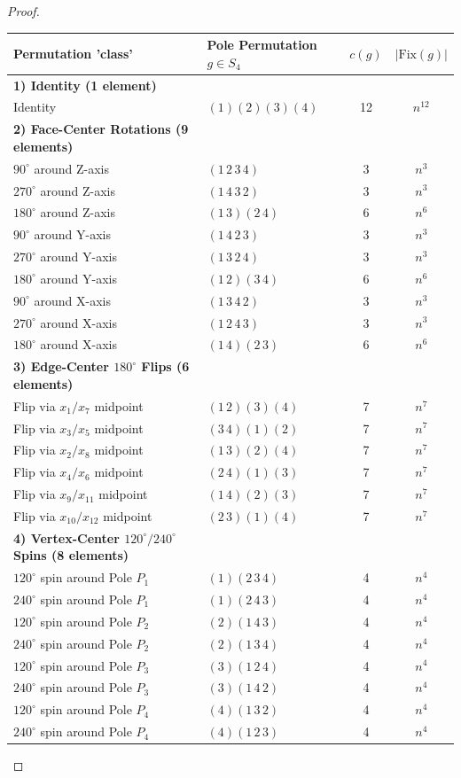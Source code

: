 \documentclass[addpoints,10pt]{exam}
\theoremstyle{plain}
\theoremstyle{definition}
\theoremstyle{plain}
\theoremstyle{plain}
\theoremstyle{definition}
\begin{document}
\begin{proof}
\noindent 
\bgroup
\def\arraystretch{1} 
\begin{center}
\begin{tabular}{l|l|c|c}
\textbf{Permutation 'class'} & \textbf{Pole Permutation $g \in S_4$} & $c(g)$ & $|\mathrm{Fix}(g)|$ \\
\hline
\textbf{1) Identity (1 element)} & & & \\
Identity & $(1)(2)(3)(4)$ & 12 & $n^{12}$ \\
\hline
\textbf{2) Face-Center Rotations (9 elements)} & & & \\
$90^\circ$ around Z-axis & $(1\,2\,3\,4)$ & 3 & $n^3$ \\
$270^\circ$ around Z-axis & $(1\,4\,3\,2)$ & 3 & $n^3$ \\
$180^\circ$ around Z-axis & $(1\,3)(2\,4)$ & 6 & $n^6$ \\
$90^\circ$ around Y-axis & $(1\,4\,2\,3)$ & 3 & $n^3$ \\
$270^\circ$ around Y-axis & $(1\,3\,2\,4)$ & 3 & $n^3$ \\
$180^\circ$ around Y-axis & $(1\,2)(3\,4)$ & 6 & $n^6$ \\
$90^\circ$ around X-axis & $(1\,3\,4\,2)$ & 3 & $n^3$ \\
$270^\circ$ around X-axis & $(1\,2\,4\,3)$ & 3 & $n^3$ \\
$180^\circ$ around X-axis & $(1\,4)(2\,3)$ & 6 & $n^6$ \\
\hline
\textbf{3) Edge-Center $180^\circ$ Flips (6 elements)} & & & \\
Flip via $x_1/x_7$ midpoint & $(1\,2)(3)(4)$ & 7 & $n^7$ \\
Flip via $x_3/x_5$ midpoint & $(3\,4)(1)(2)$ & 7 & $n^7$ \\
Flip via $x_2/x_8$ midpoint & $(1\,3)(2)(4)$ & 7 & $n^7$ \\
Flip via $x_4/x_6$ midpoint & $(2\,4)(1)(3)$ & 7 & $n^7$ \\
Flip via $x_9/x_{11}$ midpoint & $(1\,4)(2)(3)$ & 7 & $n^7$ \\
Flip via $x_{10}/x_{12}$ midpoint & $(2\,3)(1)(4)$ & 7 & $n^7$ \\
\hline
\textbf{4) Vertex-Center $120^\circ/240^\circ$ Spins (8 elements)} & & & \\
$120^\circ$ spin around Pole $P_1$ & $(1)(2\,3\,4)$ & 4 & $n^4$ \\
$240^\circ$ spin around Pole $P_1$ & $(1)(2\,4\,3)$ & 4 & $n^4$ \\
$120^\circ$ spin around Pole $P_2$ & $(2)(1\,4\,3)$ & 4 & $n^4$ \\
$240^\circ$ spin around Pole $P_2$ & $(2)(1\,3\,4)$ & 4 & $n^4$ \\
$120^\circ$ spin around Pole $P_3$ & $(3)(1\,2\,4)$ & 4 & $n^4$ \\
$240^\circ$ spin around Pole $P_3$ & $(3)(1\,4\,2)$ & 4 & $n^4$ \\
$120^\circ$ spin around Pole $P_4$ & $(4)(1\,3\,2)$ & 4 & $n^4$ \\
$240^\circ$ spin around Pole $P_4$ & $(4)(1\,2\,3)$ & 4 & $n^4$ \\
\end{tabular}
\end{center}
\egroup


\end{proof}
\end{document}
